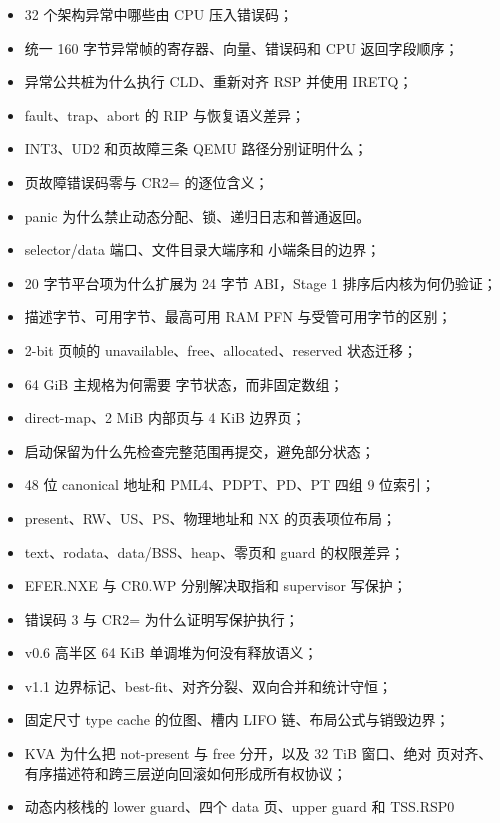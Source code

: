 \begin{itemize}
  \item 32 个架构异常中哪些由 CPU 压入错误码；
  \item 统一 160 字节异常帧的寄存器、向量、错误码和 CPU 返回字段顺序；
  \item 异常公共桩为什么执行 CLD、重新对齐 RSP 并使用 IRETQ；
  \item fault、trap、abort 的 RIP 与恢复语义差异；
  \item INT3、UD2 和页故障三条 QEMU 路径分别证明什么；
  \item 页故障错误码零与 CR2= 的逐位含义；
  \item panic 为什么禁止动态分配、锁、递归日志和普通返回。
  \item {} selector/data 端口、文件目录大端序和
         小端条目的边界；
  \item 20 字节平台项为什么扩展为 24 字节 ABI，Stage 1 排序后内核为何仍验证；
  \item 描述字节、可用字节、最高可用 RAM PFN 与受管可用字节的区别；
  \item 2-bit 页帧的 unavailable、free、allocated、reserved 状态迁移；
  \item 64 GiB 主规格为何需要  字节状态，而非固定数组；
  \item {} direct-map、2 MiB 内部页与 4 KiB 边界页；
  \item 启动保留为什么先检查完整范围再提交，避免部分状态；
  \item 48 位 canonical 地址和 PML4、PDPT、PD、PT 四组 9 位索引；
  \item present、RW、US、PS、物理地址和 NX 的页表项位布局；
  \item text、rodata、data/BSS、heap、零页和 guard 的权限差异；
  \item EFER.NXE 与 CR0.WP 分别解决取指和 supervisor 写保护；
  \item 错误码 3 与 CR2= 为什么证明写保护执行；
  \item v0.6 高半区 64 KiB 单调堆为何没有释放语义；
  \item v1.1 边界标记、best-fit、对齐分裂、双向合并和统计守恒；
  \item 固定尺寸 type cache 的位图、槽内 LIFO 链、布局公式与销毁边界；
  \item KVA 为什么把 not-present 与 free 分开，以及 32 TiB 窗口、绝对
        页对齐、有序描述符和跨三层逆向回滚如何形成所有权协议；
  \item 动态内核栈的 lower guard、四个 data 页、upper guard 和 TSS.RSP0

\end{itemize}
